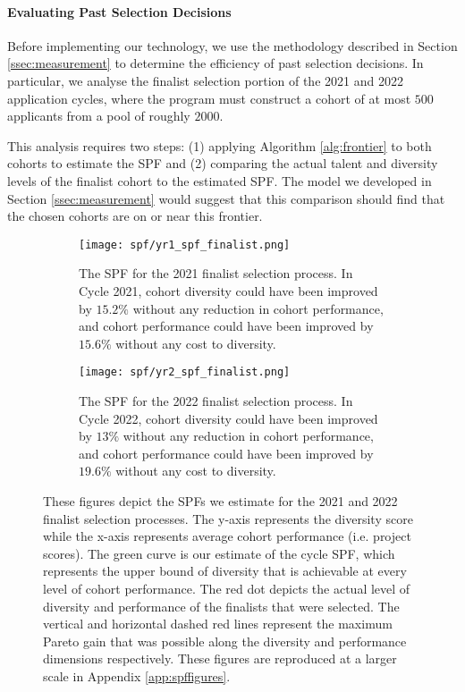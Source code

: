 \paragraph{Evaluating Past Selection Decisions} Before implementing our technology, we use the methodology described in Section \ref{ssec:measurement} to determine the efficiency of past selection decisions. In particular, we analyse the finalist selection portion of the 2021 and 2022 application cycles, where the program must construct a cohort of at most $500$ applicants from a pool of roughly $2000$. 

This analysis requires two steps: (1) applying Algorithm \ref{alg:frontier} to both cohorts to estimate the SPF and (2) comparing the actual talent and diversity levels of the finalist cohort to the estimated SPF. The model we developed in Section \ref{ssec:measurement} would suggest that this comparison should find that the chosen cohorts are on or near this frontier. 

\begin{figure}[htbp]
    \centering
    \begin{subfigure}[b]{0.4\textwidth}
        \texttt{[image: spf/yr1\_spf\_finalist.png]}
        \caption{The SPF for the 2021 finalist selection process. In Cycle 2021, cohort diversity could have been improved by $15.2\%$ without any reduction in cohort performance, and cohort performance could have been improved by $15.6\%$ without any cost to diversity.}
        \label{fig:spf_2021}
    \end{subfigure}
    \hfill
    \begin{subfigure}[b]{0.4\textwidth}
        \texttt{[image: spf/yr2\_spf\_finalist.png]}
        \caption{The SPF for the 2022 finalist selection process. In Cycle 2022, cohort diversity could have been improved by $13\%$ without any reduction in cohort performance, and cohort performance could have been improved by $19.6\%$ without any cost to diversity.}
        \label{fig:spf_2022}
    \end{subfigure}
    \caption{These figures depict the SPFs we estimate for the 2021 and 2022 finalist selection processes. The y-axis represents the diversity score while the x-axis represents average cohort performance (i.e. project scores). The green curve is our estimate of the cycle SPF, which represents the upper bound of diversity that is achievable at every level of cohort performance. The red dot depicts the actual level of diversity and performance of the finalists that were selected. The vertical and horizontal dashed red lines represent the maximum Pareto gain that was possible along the diversity and performance dimensions respectively. These figures are reproduced at a larger scale in Appendix \ref{app:spffigures}.}
    \label{fig:spf_2021_2022}
\end{figure}

